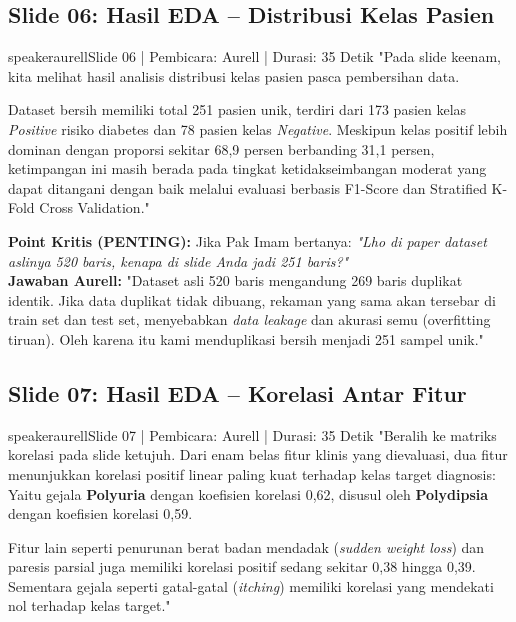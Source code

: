 \documentclass[11pt,a4paper]{article}
\begin{document}
\subsection{Slide 06: Hasil EDA -- Distribusi Kelas Pasien}
\begin{scriptbox}{speakeraurell}{Slide 06 | Pembicara: Aurell | Durasi: 35 Detik}
"Pada slide keenam, kita melihat hasil analisis distribusi kelas pasien pasca pembersihan data. 

Dataset bersih memiliki total 251 pasien unik, terdiri dari 173 pasien kelas \textit{Positive} risiko diabetes dan 78 pasien kelas \textit{Negative}. 
Meskipun kelas positif lebih dominan dengan proporsi sekitar 68,9 persen berbanding 31,1 persen, ketimpangan ini masih berada pada tingkat ketidakseimbangan moderat yang dapat ditangani dengan baik melalui evaluasi berbasis F1-Score dan Stratified K-Fold Cross Validation."
\end{scriptbox}

\begin{defensebox}
\textbf{Point Kritis (PENTING):} Jika Pak Imam bertanya: \textit{"Lho di paper dataset aslinya 520 baris, kenapa di slide Anda jadi 251 baris?"}\\
\textbf{Jawaban Aurell:} "Dataset asli 520 baris mengandung 269 baris duplikat identik. Jika data duplikat tidak dibuang, rekaman yang sama akan tersebar di train set dan test set, menyebabkan \textit{data leakage} dan akurasi semu (overfitting tiruan). Oleh karena itu kami menduplikasi bersih menjadi 251 sampel unik."
\end{defensebox}

\subsection{Slide 07: Hasil EDA -- Korelasi Antar Fitur}
\begin{scriptbox}{speakeraurell}{Slide 07 | Pembicara: Aurell | Durasi: 35 Detik}
"Beralih ke matriks korelasi pada slide ketujuh. Dari enam belas fitur klinis yang dievaluasi, dua fitur menunjukkan korelasi positif linear paling kuat terhadap kelas target diagnosis:
Yaitu gejala \textbf{Polyuria} dengan koefisien korelasi 0,62, disusul oleh \textbf{Polydipsia} dengan koefisien korelasi 0,59.

Fitur lain seperti penurunan berat badan mendadak (\textit{sudden weight loss}) dan paresis parsial juga memiliki korelasi positif sedang sekitar 0,38 hingga 0,39. Sementara gejala seperti gatal-gatal (\textit{itching}) memiliki korelasi yang mendekati nol terhadap kelas target."
\end{scriptbox}
\end{document}

